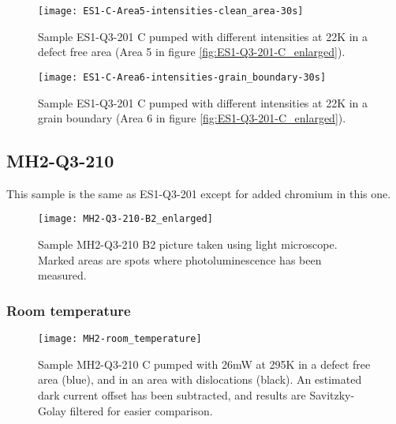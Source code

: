 \begin{figure}[H]
\centering
\texttt{[image: ES1-C-Area5-intensities-clean\_area-30s]}
\caption[ES1-Q3-201 at a defect free area]{Sample ES1-Q3-201 C pumped with different intensities at 22K in a defect free area (Area 5 in figure \ref{fig:ES1-Q3-201-C_enlarged}).}
\label{fig:ES1-C-Area5-intensities-clean_area-30s}%
\end{figure}

\begin{figure}[H]
\centering
\texttt{[image: ES1-C-Area6-intensities-grain\_boundary-30s]}
\caption[ES1-Q3-201 at a grain boundary]{Sample ES1-Q3-201 C pumped with different intensities at 22K in a grain boundary (Area 6 in figure \ref{fig:ES1-Q3-201-C_enlarged}).}
\label{fig:ES1-C-Area6-intensities-grain_boundary-30s}%
\end{figure}





\subsection{MH2-Q3-210}

This sample is the same as ES1-Q3-201 except for added chromium in this one.



\begin{figure}[H]
\centering
\texttt{[image: MH2-Q3-210-B2\_enlarged]}
\caption[MH2-Q3-210 B2 from light microscope]{Sample MH2-Q3-210 B2 picture taken using light microscope. Marked areas are spots where photoluminescence has been measured.}
\label{fig:MH2-Q3-210-B2_enlarged}%
\end{figure}



\subsubsection{Room temperature}

\begin{figure}[H]
\centering
\texttt{[image: MH2-room\_temperature]}
\caption[MH2-Q3-210 at room temperature]{Sample MH2-Q3-210 C pumped with 26mW at 295K in a defect free area (blue), and in an area with dislocations (black). An estimated dark current offset has been subtracted, and results are Savitzky-Golay filtered for easier comparison.}
\label{fig:MH2-room_temperature}%
\end{figure}

